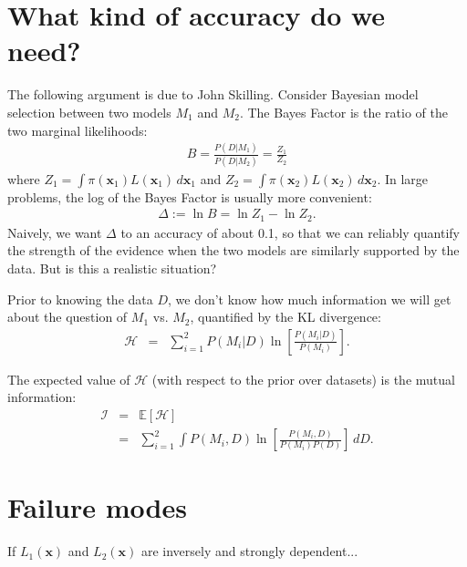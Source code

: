 \documentclass[journal,article,accept,moreauthors,pdftex,12pt,a4paper]{mdpi}
\newcommand{\xx}{\boldsymbol{x}}
\begin{document}
\section{What kind of accuracy do we need?}

The following argument is due to John Skilling. Consider Bayesian model selection
between two models $M_1$ and $M_2$. The Bayes Factor is the ratio of the
two marginal likelihoods:
\begin{eqnarray}
B = \frac{P(D | M_1)}{P(D | M_2)} = \frac{Z_1}{Z_2}
\end{eqnarray}
where $Z_1 = \int \pi(\xx_1)L(\xx_1) \, d\xx_1$ and
$Z_2 = \int \pi(\xx_2)L(\xx_2) \, d\xx_2$.
In large problems, the log of the Bayes Factor is usually more convenient:
\begin{eqnarray}
\Delta := \ln B = \ln Z_1 - \ln Z_2.
\end{eqnarray}
Naively, we want $\Delta$ to an accuracy of about 0.1, so that we can reliably
quantify the strength of the evidence when the two models are similarly
supported by the data. But is this a realistic situation?

Prior to knowing the data $D$, we don't know how much information we will get
about the question of $M_1$ vs. $M_2$, quantified by the KL divergence:
\begin{eqnarray}
\mathcal{H} &=& \sum_{i=1}^2 P(M_i | D)
\ln\left[
\frac{P(M_i | D)}{P(M_i)}
\right].
\end{eqnarray}

The expected value of $\mathcal{H}$ (with respect to the prior over datasets)
is the mutual information:
\begin{eqnarray}
\mathcal{I} &=& \mathds{E}\left[\mathcal{H}\right]\\
&=&
\sum_{i=1}^2 \int P(M_i, D)
\ln\left[
\frac{P(M_i, D)}{P(M_i)P(D)}
\right] \, dD.
\end{eqnarray}

\section{Failure modes}\label{sec:failure_modes}

If $L_1(\xx)$ and $L_2(\xx)$ are inversely and strongly dependent...


\end{document}
